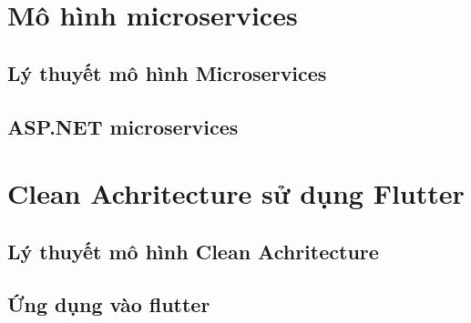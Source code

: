 \section{Mô hình microservices}
\subsection{Lý thuyết mô hình Microservices}
\subsection{ASP.NET microservices}
\section{Clean Achritecture sử dụng Flutter}
\subsection{Lý thuyết mô hình Clean Achritecture}
\subsection{Ứng dụng vào flutter}
